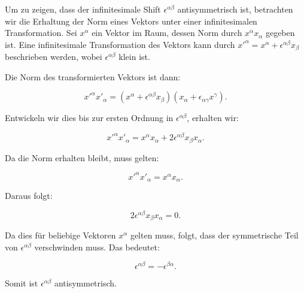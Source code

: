 Um zu zeigen, dass der infinitesimale Shift $\epsilon^{\alpha \beta}$ antisymmetrisch ist, betrachten wir die Erhaltung der Norm eines Vektors unter einer infinitesimalen Transformation. Sei $x^\alpha$ ein Vektor im Raum, dessen Norm durch $x^\alpha x_\alpha$ gegeben ist. Eine infinitesimale Transformation des Vektors kann durch $x'^\alpha = x^\alpha + \epsilon^{\alpha \beta} x_\beta$ beschrieben werden, wobei $\epsilon^{\alpha \beta}$ klein ist.

Die Norm des transformierten Vektors ist dann:

\[
x'^\alpha x'_\alpha = (x^\alpha + \epsilon^{\alpha \beta} x_\beta)(x_\alpha + \epsilon_{\alpha \gamma} x^\gamma).
\]

Entwickeln wir dies bis zur ersten Ordnung in $\epsilon^{\alpha \beta}$, erhalten wir:

\[
x'^\alpha x'_\alpha = x^\alpha x_\alpha + 2 \epsilon^{\alpha \beta} x_\beta x_\alpha.
\]

Da die Norm erhalten bleibt, muss gelten:

\[
x'^\alpha x'_\alpha = x^\alpha x_\alpha.
\]

Daraus folgt:

\[
2 \epsilon^{\alpha \beta} x_\beta x_\alpha = 0.
\]

Da dies für beliebige Vektoren $x^\alpha$ gelten muss, folgt, dass der symmetrische Teil von $\epsilon^{\alpha \beta}$ verschwinden muss. Das bedeutet:

\[
\epsilon^{\alpha \beta} = -\epsilon^{\beta \alpha}.
\]

Somit ist $\epsilon^{\alpha \beta}$ antisymmetrisch.